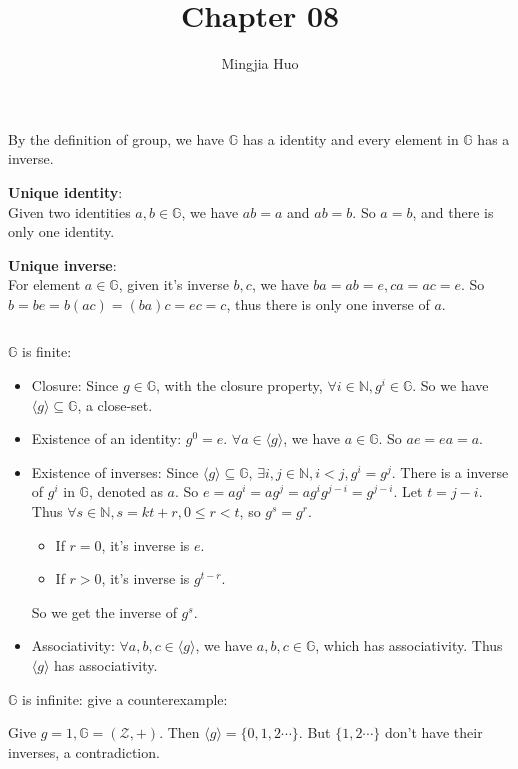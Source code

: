 \documentclass[a4paper]{article}
\newcommand{\G}{\mathbb{G}}
\newcommand{\Z}{\mathcal{Z}}
\newenvironment{problem}[2][Problem]{\begin{trivlist}
\item[\hskip \labelsep {\bfseries #1}\hskip \labelsep {\bfseries #2.}]}{\end{trivlist}}
\begin{document}
 
 
\title{Chapter 08}
\author{Mingjia Huo}
\date{}
\maketitle

\begin{problem}{8.1}
By the definition of group, we have $\G$ has a identity and every element in $\G$ has a inverse.\par
\textbf{Unique identity}:\\
Given two identities $a,b\in\G$, we have $ab=a$ and $ab=b$. So $a=b$, and there is only one identity. \par
\textbf{Unique inverse}:\\
For element $a\in\G$, given it's inverse $b,c$, we have $ba=ab=e, ca=ac=e$. So $b=be=b(ac)=(ba)c=ec=c$, thus there is only one inverse of $a$.
\end{problem}

\begin{problem}{8.3}$ $\par
$\G$ is finite:
\begin{itemize}
    \item Closure: Since $g\in\G$, with the closure property, $\forall i\in\mathbb{N},g^i\in\G$. So we have $\langle g\rangle\subseteq\G$, a close-set.
    \item Existence of an identity: $g^0=e$. $\forall a\in\langle g\rangle$, we have $a\in\G$. So $ae=ea=a$.
    \item Existence of inverses: Since $\langle g\rangle\subseteq\G$, $\exists i,j\in\mathbb{N},i<j, g^i=g^j$. There is a inverse of $g^i$ in $\G$, denoted as $a$. So $e=ag^i=ag^j=ag^ig^{j-i}=g^{j-i}$. Let $t=j-i$. Thus $\forall s\in\mathbb{N}, s=kt+r,0\le r<t$, so $g^s=g^r$.\begin{itemize}
        \item If $r=0$, it's inverse is $e$.
        \item If $r>0$, it's inverse is $g^{t-r}$.
    \end{itemize} So we get the inverse of $g^s$.
    \item Associativity: $\forall a,b,c\in\langle g\rangle$, we have $a,b,c\in\G$, which has associativity. Thus $\langle g\rangle$ has associativity.
\end{itemize}\par\vspace{1ex}
$\G$ is infinite: give a counterexample:\par
Give $g=1,\G=(\Z,+)$. Then $\langle g\rangle=\{0,1,2\cdots\}$. But $\{1,2\cdots\}$ don't have their inverses, a contradiction.

\end{problem}
\end{document}
